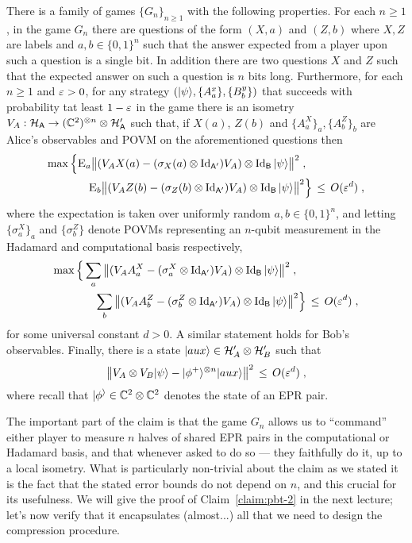 \begin{claim}\label{claim:pbt-2}
There is a family of games $\{G_n\}_{n\geq 1}$ with the following properties. For each $n\geq 1$, in the game $G_n$ there are questions of the form $(X,a)$ and $(Z,b)$ where $X,Z$ are labels and $a,b\in\{0,1\}^n$ such that the answer expected from a player upon such a question is a single bit. In addition there are two questions $X$ and $Z$ such that the expected answer on such a question is $n$ bits long. Furthermore, for each $n\geq 1$ and $\varepsilon>0$, for any strategy $(|\psi\rangle,\{A^x_a\},\{B^y_b\})$ that succeeds with probability tat least $1-\varepsilon$ in the game there is an isometry $V_A:\mathcal{H}_{\textsf{A}} \to (\mathbb{C}^2)^{\otimes n} \otimes \mathcal{H}'_{{\textsf{A}}}$ such that, if $X(a)$, $Z(b)$ and $\{A^X_a\}_a,\{A^Z_b\}_b$ are Alice's observables and POVM on the aforementioned questions then 
\begin{align*}
 \max\Big\{&\textsc{E}_{a} \big\| (V_A X(a) - (\sigma_X(a)\otimes \mathop{\rm Id}\nolimits_{{\textsf{A}}'}) V_A )\otimes \mathop{\rm Id}\nolimits_{\textsf{B}} |\psi\rangle \big\|^2\;,\\
&\quad \textsc{E}_{b}\big\| (V_A Z(b) - (\sigma_Z(b)\otimes \mathop{\rm Id}\nolimits_{{\textsf{A}}'}) V_A )\otimes \mathop{\rm Id}\nolimits_{\textsf{B}} |\psi\rangle \big\|^2 \Big\} \,\leq\, O(\varepsilon^d)\;,
\end{align*}
where the expectation is taken over uniformly random $a,b\in\{0,1\}^n$, and letting $\{\sigma^X_a\}_a$ and $\{\sigma^Z_b\}$ denote POVMs representing an $n$-qubit measurement in the Hadamard and computational basis respectively,
\begin{align*}
 \max\Big\{& \sum_a \big\| (V_A A^X_a  - (\sigma^X_a\otimes \mathop{\rm Id}\nolimits_{{\textsf{A}}'}) V_A )\otimes \mathop{\rm Id}\nolimits_{{\textsf{B}}}|\psi\rangle \big\|^2 \;,\\
&\quad  \sum_b \big\| (V_A A^Z_b  - (\sigma^Z_b\otimes \mathop{\rm Id}\nolimits_{{\textsf{A}}'}) V_A )\otimes \mathop{\rm Id}\nolimits_{{\textsf{B}}}|\psi\rangle \big\|^2 \Big\} \,\leq\, O(\varepsilon^d)\;,
\end{align*}
for some universal constant $d>0$. A similar statement holds for Bob's observables. Finally, there is a state $|aux\rangle \in \mathcal{H}'_A \otimes \mathcal{H}'_B$ such that 
\[ \big\| V_A \otimes V_B |\psi\rangle - |\phi^+\rangle^{\otimes n} |aux\rangle \big\|^2 \,\leq\, O(\varepsilon^d)\;,\]
where recall that $|\phi^\rangle \in \mathbb{C}^2 \otimes \mathbb{C}^2$ denotes the state of an EPR pair. 
\end{claim}

The important part of the claim is that the game $G_n$ allows us to ``command'' either player to measure $n$ halves of shared EPR pairs in the computational or Hadamard basis, and that whenever asked to do so --- they faithfully do it, up to a local isometry. What is particularly non-trivial about the claim as we stated it is the fact that the stated error bounds do not depend on $n$, and this crucial for its usefulness. 
 We will give the proof of Claim~\ref{claim:pbt-2} in the next lecture; let's now verify that it encapsulates (almost...) all that we need to design the compression procedure. 


